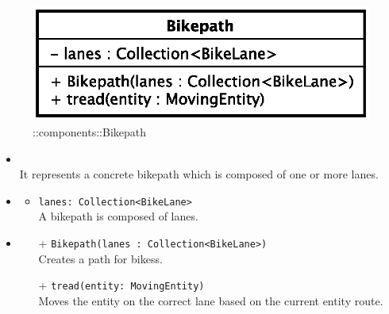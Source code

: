 \begin{figure}[h]
\centering
\includegraphics[scale=0.6,keepaspectratio]{images/solution/bikepath.eps}
\caption{\pReactiveComponent::components::Bikepath}
\label{fig:sd-app-bikepath}
\end{figure}
\FloatBarrier
\begin{itemize}
  \item \textbf{\descr} \\
    It represents a concrete bikepath which is composed of one or more lanes.
  \item \textbf{\attrs}
  \begin{itemize}
    \item \texttt{lanes: Collection<BikeLane>} \\
A bikepath is composed of lanes.
  \end{itemize}
  \item \textbf{\ops}
  \begin{itemize}
  \item[+] \texttt{Bikepath(lanes : Collection<BikeLane>)} \\
    Creates a path for bikess.
    \item[+] \texttt{tread(entity: MovingEntity)} \\
Moves the entity on the correct lane based on the current entity route. 
  \end{itemize}
\end{itemize}
